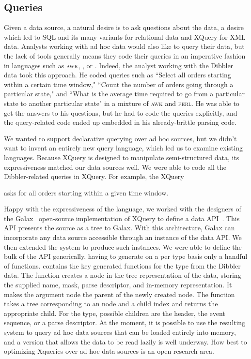 \documentclass{sig-alternate}
\begin{document}
\subsection{Queries}
Given a data source, a natural desire is to ask questions about the data, a desire which led to SQL and its many variants for relational data and XQuery for XML data.  Analysts working with ad hoc data would also like to query their
data, but the lack of tools generally means they code their queries in an imperative fashion in languages such as \textsc{awk}, \perl{}, or \C{}.
Indeed, the analyst working with the Dibbler data took this approach.
He coded queries such as ``Select all orders starting within a certain time window," ``Count the number of orders going through a particular state," and ``What is the average time required to go from a particular state to another
particular state" in a mixture of \textsc{awk} and \textsc{perl}.  He was
able to get the answers to his questions, but he had to code the queries explicitly, and the query-related code ended up embedded in his already-brittle parsing code.

We wanted to support declarative querying over ad hoc sources, but we didn't want to invent an entirely new query language, which led us to examine existing languages.  Because XQuery is designed to manipulate semi-structured data, its expressiveness matched our data sources well.  We were able to code all the Dibbler-related queries in XQuery.  For example, the XQuery
\begin{code}
\end{code}
asks for all orders starting within a given time window.  

Happy with the expressiveness of the language, we worked with the designers of the Galax~\cite{galax} open-source implementation of XQuery to define a data API~\cite{galaxmanual}.  This API presents the source as a tree to Galax. With this architecture, Galax can incorporate any data source accessible through an instance of the data API.  We then extended the \pads{} system to produce such instances.  We were able to define the bulk of the API generically, having to generate on a per type basis only a handful of functions. 
 contains the key generated functions for the  type from the Dibbler data.    The   function creates a node in the tree representation of the data, storing the supplied name, mask, parse descriptor, and in-memory representation.  It makes the argument node the parent of the newly created node.
The  function takes a tree
corresponding to an  node and a child index and returns the appropriate child.  For the  type, possible children are the header, the event sequence, or a parse descriptor. 
At the moment, it is possible to use the resulting system to query ad hoc data sources that can be loaded entirely into memory, and a version that allows the data to be read lazily is well underway.
How best to optimizing Xqueries over ad hoc data sources is an open research area.
\end{document}
